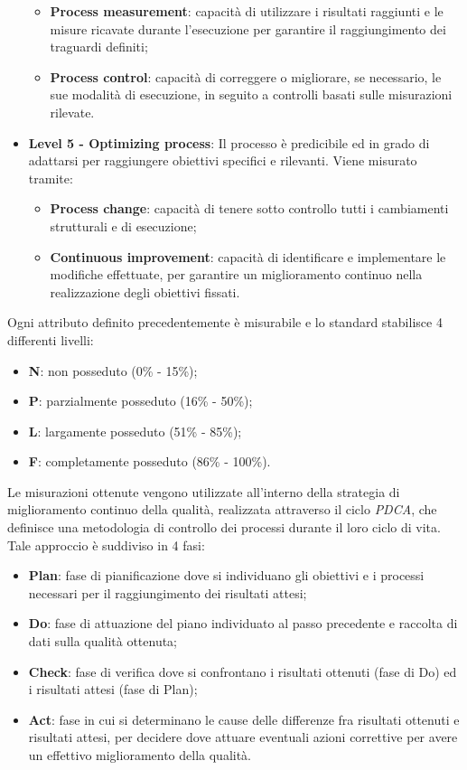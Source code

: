 \begin{itemize}
\begin{itemize}
\item\textbf{Process measurement}: capacità di utilizzare i risultati raggiunti e le misure ricavate durante l'esecuzione per garantire il raggiungimento dei traguardi definiti;
\item\textbf{Process control}: capacità di correggere o migliorare, se necessario,  le sue modalità di esecuzione, in seguito a controlli basati sulle misurazioni rilevate.
\end{itemize}
\item\textbf{Level 5 - Optimizing process}: Il processo è predicibile ed in grado di adattarsi per raggiungere obiettivi specifici e rilevanti. Viene misurato tramite:
\begin{itemize}
\item\textbf{Process change}: capacità di tenere sotto controllo tutti i cambiamenti strutturali e di esecuzione;
\item\textbf{Continuous improvement}: capacità di identificare
e implementare le modifiche effettuate, per garantire un miglioramento continuo nella realizzazione degli obiettivi fissati.
\end{itemize}
\end{itemize} 	

Ogni attributo definito precedentemente è misurabile e lo standard stabilisce
4 differenti livelli:
\begin{itemize}
\item\textbf{N}: non posseduto (0\% - 15\%);
\item\textbf{P}: parzialmente posseduto (16\% - 50\%);
\item\textbf{L}: largamente posseduto (51\% - 85\%);
\item\textbf{F}: completamente posseduto (86\% - 100\%).
\end{itemize}

Le misurazioni ottenute vengono utilizzate all'interno della strategia di miglioramento continuo della qualità, realizzata attraverso il ciclo \textit{PDCA}, che definisce una metodologia di controllo dei processi durante il loro ciclo di vita.
Tale approccio è suddiviso in 4 fasi:
\begin{itemize}
\item \textbf{Plan}: fase di pianificazione dove si individuano gli obiettivi e i processi necessari per il raggiungimento dei risultati attesi;
\item \textbf{Do}: fase di attuazione del piano individuato al passo precedente e raccolta di dati sulla qualità ottenuta;
\item \textbf{Check}: fase di verifica dove si confrontano i risultati ottenuti (fase di Do) ed i risultati attesi (fase di Plan);
\item \textbf{Act}: fase in cui si determinano le cause delle differenze fra risultati ottenuti e risultati attesi, per decidere dove attuare eventuali azioni correttive per avere un effettivo miglioramento della qualità.
\end{itemize}

